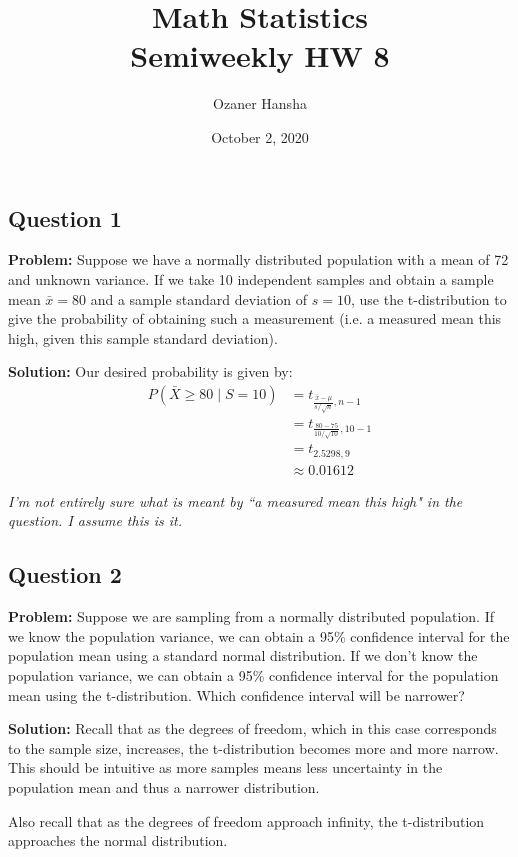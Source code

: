 \documentclass{article}
\begin{document}
\title{Math Statistics\\ Semiweekly HW 8}
\author{Ozaner Hansha}
\date{October 2, 2020}
\maketitle

\subsection*{Question 1}
\noindent\textbf{Problem:} Suppose we have a normally distributed population with a mean of 72 and unknown variance. If we take 10 independent samples and obtain a sample mean $\bar{x}=80$ and a sample standard deviation of $s=10$, use the t-distribution to give the probability of obtaining such a measurement (i.e. a measured mean this high, given this sample standard deviation).
\bigskip

\noindent\textbf{Solution:} Our desired probability is given by:
\begin{align*}
    P(\bar{X}\ge 80\mid S=10)&=t_{\frac{\bar{x}-\mu}{s/\sqrt{n}},n-1}\\
    &=t_{\frac{80-75}{10/\sqrt{10}},10-1}\\
    &=t_{2.5298,9}\\
    &\approx0.01612
\end{align*}

\textit{I'm not entirely sure what is meant by ``a measured mean this high" in the question. I assume this is it.}

\subsection*{Question 2}
\noindent\textbf{Problem:} Suppose we are sampling from a normally distributed population. If we know the population variance, we can obtain a 95\% confidence interval for the population mean using a standard normal distribution. If we don’t know the population variance, we can obtain a 95\% confidence interval for the population mean using the t-distribution. Which confidence interval will be narrower?
\bigskip

\noindent\textbf{Solution:} Recall that as the degrees of freedom, which in this case corresponds to the sample size, increases, the t-distribution becomes more and more narrow. This should be intuitive as more samples means less uncertainty in the population mean and thus a narrower distribution.

Also recall that as the degrees of freedom approach infinity, the t-distribution approaches the normal distribution.
\end{document}
